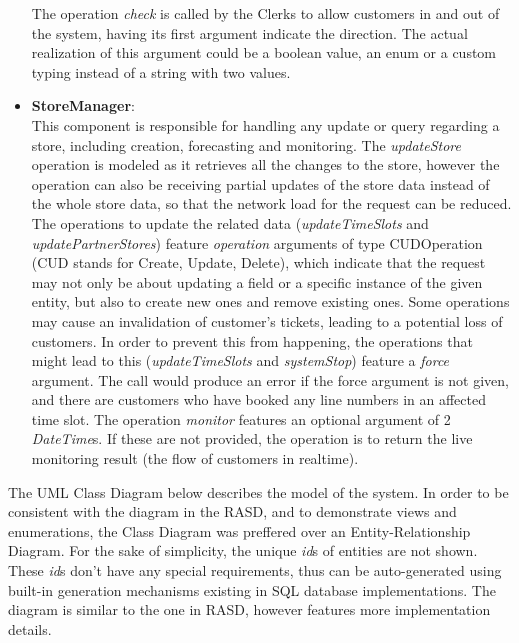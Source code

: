\begin{itemize}
    The operation \textit{check} is called by the Clerks to allow customers in and out of the system, having its first argument indicate the direction.
    The actual realization of this argument could be a boolean value, an enum or a custom typing instead of a string with two values.
    \item \textbf{StoreManager}: \\
    This component is responsible for handling any update or query regarding a store, including creation, forecasting and monitoring.
    The \textit{updateStore} operation is modeled as it retrieves all the changes to the store, however the operation can also be receiving partial updates of the store data instead of the whole store data, so that the network load for the request can be reduced.
    The operations to update the related data (\textit{updateTimeSlots} and \textit{updatePartnerStores}) feature \textit{operation} arguments of type CUDOperation (CUD stands for Create, Update, Delete), which indicate that the request may not only be about updating a field or a specific instance of the given entity, but also to create new ones and remove existing ones.
    Some operations may cause an invalidation of customer's tickets, leading to a potential loss of customers.
    In order to prevent this from happening, the operations that might lead to this (\textit{updateTimeSlots} and \textit{systemStop}) feature a \textit{force} argument.
    The call would produce an error if the force argument is not given, and there are customers who have booked any line numbers in an affected time slot.
    The operation \textit{monitor} features an optional argument of 2 \textit{DateTime}s.
    If these are not provided, the operation is to return the live monitoring result (the flow of customers in realtime).
\end{itemize}

The UML Class Diagram below describes the model of the system.
In order to be consistent with the diagram in the RASD, and to demonstrate views and enumerations, the Class Diagram was preffered over an Entity-Relationship Diagram.
For the sake of simplicity, the unique \textit{id}s of entities are not shown.
These \textit{id}s don't have any special requirements, thus can be auto-generated using built-in generation mechanisms existing in SQL database implementations.
The diagram is similar to the one in RASD, however features more implementation details.


